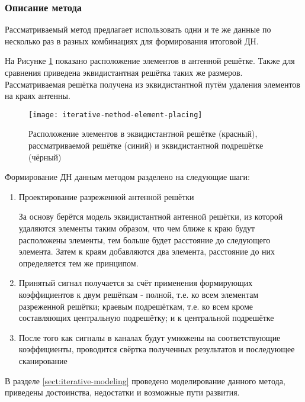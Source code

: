 \subsubsection{Описание метода}

Рассматриваемый метод предлагает использовать одни и те же данные по несколько раз в разных комбинациях для 
формирования итоговой ДН.

На Рисунке \ref{fig:iterative-method-element-placing} показано расположение элементов в антенной решётке. Также для сравнения 
приведена эквидистантная решётка таких же размеров. Рассматриваемая решётка получена из эквидистантной путём 
удаления элементов на краях антенны. 

\begin{figure}[!ht]
    \centering
    \texttt{[image: iterative-method-element-placing]}
    \caption{Расположение элементов в эквидистантной решётке (красный), рассматриваемой решётке (синий) и эквидистантной подрешётке (чёрный)}%
    \label{fig:iterative-method-element-placing}
\end{figure}

Формирование ДН данным методом разделено на следующие шаги:

\begin{enumerate}
    \item Проектирование разреженной антенной решётки
    
    За основу берётся модель эквидистантной антенной решётки, из которой удаляются элементы таким образом, что чем ближе к 
    краю будут расположены элементы, тем больше будет расстояние до следующего элемента. Затем к краям добавляются 
    два элемента, расстояние до них определяется тем же принципом.
    \item Принятый сигнал получается за счёт применения формирующих коэффициентов к двум решёткам - полной, т.е. ко 
    всем элементам разреженной решётки; краевым подрешёткам, т.е. ко всем кроме составляющих центральную подрешётку; 
    и к центральной подрешётке
    \item После того как сигналы в каналах будут умножены на соответствующие коэффициенты, проводится 
    свёртка полученных результатов и последующее сканирование
\end{enumerate}

В разделе \ref{sect:iterative-modeling} проведено моделирование данного метода, приведены достоинства, недостатки и возможные пути развития.